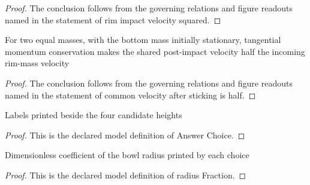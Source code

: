 \begin{proof}
  The conclusion follows from the governing relations and figure readouts named in the statement of rim impact velocity squared.
\end{proof}
\begin{lemma}
  \label{lem:physics:phyx-mini-0767:phyxminiproblems-problemphyxmini0767-common-velocity-after-sticking-is-half}
  For two equal masses, with the bottom mass initially stationary, tangential momentum conservation makes the shared post-impact velocity half the incoming rim-mass velocity
\end{lemma}
\begin{proof}
  The conclusion follows from the governing relations and figure readouts named in the statement of common velocity after sticking is half.
\end{proof}
\begin{definition}
  \label{def:physics:phyx-mini-0767:phyxminiproblems-problemphyxmini0767-answerchoice}
  Labels printed beside the four candidate heights
\end{definition}
\begin{proof}
  This is the declared model definition of Answer Choice.
\end{proof}
\begin{definition}
  \label{def:physics:phyx-mini-0767:phyxminiproblems-problemphyxmini0767-answerchoice-radiusfraction}
  Dimensionless coefficient of the bowl radius printed by each choice
\end{definition}
\begin{proof}
  This is the declared model definition of radius Fraction.
\end{proof}
